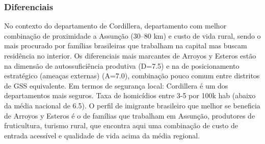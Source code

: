 \subsubsection*{Diferenciais}\label{dif-arroyos-y-esteros-0303}
No contexto do departamento de Cordillera, departamento com melhor combinação de proximidade a Assunção (30–80 km) e custo de vida rural, sendo o mais procurado por famílias brasileiras que trabalham na capital mas buscam residência no interior. Os diferenciais mais marcantes de Arroyos y Esteros estão na dimensão de autossuficiência produtiva (D=7.5) e na de posicionamento estratégico (ameaças externas) (A=7.0), combinação pouco comum entre distritos de GSS equivalente. Em termos de segurança local: Cordillera é um dos departamentos mais seguros. Taxa de homicídios entre 3-5 por 100k hab (abaixo da média nacional de 6.5). O perfil de imigrante brasileiro que melhor se beneficia de Arroyos y Esteros é o de famílias que trabalham em Assunção, produtores de fruticultura, turismo rural, que encontra aqui uma combinação de custo de entrada acessível e qualidade de vida acima da média regional.
